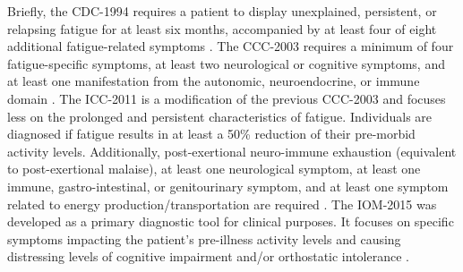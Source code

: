 Briefly, the CDC-1994 requires a patient to display unexplained, persistent, or relapsing fatigue for at least six months, accompanied by at least four of eight additional fatigue-related symptoms \citep{fukuda1994ChronicFatigue}.
The CCC-2003 requires a minimum of four fatigue-specific symptoms, at least two neurological or cognitive symptoms, and at least one manifestation from the autonomic, neuroendocrine, or immune domain \citep{carruthers2003MyalgicEncephalomyelitis}.
The ICC-2011 is a modification of the previous CCC-2003 and focuses less on the prolonged and persistent characteristics of fatigue. Individuals are diagnosed if fatigue results in at least a 50\% reduction of their pre-morbid activity levels. Additionally, post-exertional neuro-immune exhaustion (equivalent to post-exertional malaise), at least one neurological symptom, at least one immune, gastro-intestinal, or genitourinary symptom, and at least one symptom related to energy production/transportation are required \citep{carruthers2011MyalgicEncephalomyelitis}.
The IOM-2015 was developed as a primary diagnostic tool for clinical purposes. It focuses on specific symptoms impacting the patient's pre-illness activity levels and causing distressing levels of cognitive impairment and/or orthostatic intolerance \citep{instituteofmedicine2015MyalgicEncephalomyelitis}.

